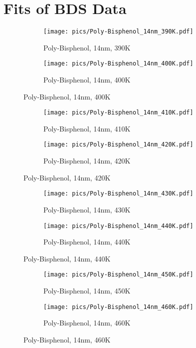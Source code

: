 \chapter{Fits of BDS Data}



\begin{figure}[!htb]
\centering
\begin{subfigure}[t]{.5\textwidth}
  \centering
  \texttt{[image: pics/Poly-Bisphenol\_14nm\_390K.pdf]}
  \caption{Poly-Bisphenol, 14nm, 390K}
  \label{fig:sub1}
\end{subfigure}%
\begin{subfigure}[t]{.5\textwidth}
  \centering
  \texttt{[image: pics/Poly-Bisphenol\_14nm\_400K.pdf]}
  \caption{Poly-Bisphenol, 14nm, 400K}
  \label{fig:sub2}
\end{subfigure}%
\end{figure}

\begin{figure}[!htb]
\centering
\begin{subfigure}[t]{.5\textwidth}
  \centering
  \texttt{[image: pics/Poly-Bisphenol\_14nm\_410K.pdf]}
  \caption{Poly-Bisphenol, 14nm, 410K}
  \label{fig:sub3}
\end{subfigure}%
\begin{subfigure}[t]{.5\textwidth}
  \centering
  \texttt{[image: pics/Poly-Bisphenol\_14nm\_420K.pdf]}
  \caption{Poly-Bisphenol, 14nm, 420K}
  \label{fig:sub4}
\end{subfigure}%
\end{figure}

\begin{figure}[!htb]
\centering
\begin{subfigure}[t]{.5\textwidth}
  \centering
  \texttt{[image: pics/Poly-Bisphenol\_14nm\_430K.pdf]}
  \caption{Poly-Bisphenol, 14nm, 430K}
  \label{fig:sub5}
\end{subfigure}%
\begin{subfigure}[t]{.5\textwidth}
  \centering
  \texttt{[image: pics/Poly-Bisphenol\_14nm\_440K.pdf]}
  \caption{Poly-Bisphenol, 14nm, 440K}
  \label{fig:sub6}
\end{subfigure}%
\end{figure}

\begin{figure}[!htb]
\centering
\begin{subfigure}[t]{.5\textwidth}
  \centering
  \texttt{[image: pics/Poly-Bisphenol\_14nm\_450K.pdf]}
  \caption{Poly-Bisphenol, 14nm, 450K}
  \label{fig:sub7}
\end{subfigure}%
\begin{subfigure}[t]{.5\textwidth}
  \centering
  \texttt{[image: pics/Poly-Bisphenol\_14nm\_460K.pdf]}
  \caption{Poly-Bisphenol, 14nm, 460K}
  \label{fig:sub8}
\end{subfigure}%
\end{figure}

